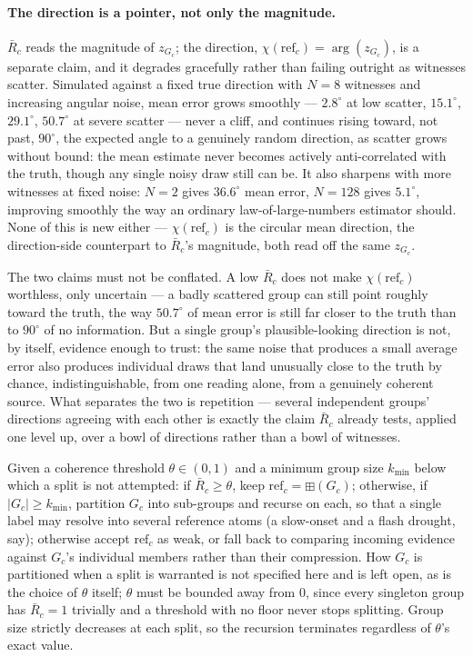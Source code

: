 \documentclass[12pt, a4paper]{article}
\begin{document}
\paragraph{The direction is a pointer, not only the magnitude.}
\label{par:direction_pointer}
$\bar R_c$ reads the magnitude of $z_{G_c}$; the direction,
$\chi(\mathrm{ref}_c)=\arg(z_{G_c})$, is a separate claim, and it
degrades gracefully rather than failing outright as witnesses
scatter. Simulated against a fixed true direction with $N=8$
witnesses and increasing angular noise, mean error grows smoothly
--- $2.8^\circ$ at low scatter, $15.1^\circ$, $29.1^\circ$,
$50.7^\circ$ at severe scatter --- never a cliff, and continues
rising toward, not past, $90^\circ$, the expected angle to a
genuinely random direction, as scatter grows without bound: the mean
estimate never becomes actively anti-correlated with the truth,
though any single noisy draw still can be. It also sharpens with
more witnesses at fixed noise: $N=2$ gives $36.6^\circ$ mean error,
$N=128$ gives $5.1^\circ$, improving smoothly the way an ordinary
law-of-large-numbers estimator should. None of this is new either
--- $\chi(\mathrm{ref}_c)$ is the circular mean direction, the
direction-side counterpart to $\bar R_c$'s magnitude, both read off
the same $z_{G_c}$.

The two claims must not be conflated. A low $\bar R_c$ does not make
$\chi(\mathrm{ref}_c)$ worthless, only uncertain --- a badly
scattered group can still point roughly toward the truth, the way
$50.7^\circ$ of mean error is still far closer to the truth than to
$90^\circ$ of no information. But a single group's plausible-looking
direction is not, by itself, evidence enough to trust: the same
noise that produces a small average error also produces individual
draws that land unusually close to the truth by chance,
indistinguishable, from one reading alone, from a genuinely coherent
source. What separates the two is repetition --- several independent
groups' directions agreeing with each other is exactly the claim
$\bar R_c$ already tests, applied one level up, over a bowl of
directions rather than a bowl of witnesses.

Given a coherence threshold $\theta\in(0,1)$ and a minimum
group size $k_{\min}$ below which a split is not attempted: if
$\bar R_c\ge\theta$, keep $\mathrm{ref}_c=\boxplus(G_c)$; otherwise, if
$|G_c|\ge k_{\min}$, partition $G_c$ into sub-groups and recurse on
each, so that a single label may resolve into several reference atoms
(a slow-onset and a flash drought, say); otherwise accept
$\mathrm{ref}_c$ as weak, or fall back to comparing incoming evidence
against $G_c$'s individual members rather than their compression. How
$G_c$ is partitioned when a split is warranted is not specified here
and is left open, as is the choice of $\theta$ itself; $\theta$ must
be bounded away from $0$, since every singleton group has $\bar
R_c=1$ trivially and a threshold with no floor never stops splitting.
Group size strictly decreases at each split, so the recursion
terminates regardless of $\theta$'s exact value.
\end{document}
